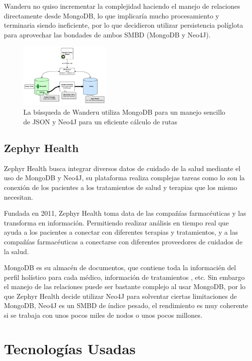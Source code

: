 \documentclass[conference]{IEEEtran}
\begin{document}
Wanderu no quiso incrementar la complejidad haciendo el manejo de relaciones directamente desde MongoDB, lo que implicar\'ia mucho procesamiento y terminaria siendo ineficiente, por lo que decidieron utilizar persistencia pol\'iglota para aprovechar las bondades de ambos SMBD (MongoDB y Neo4J).

\begin{figure}[!h]
\centering
\includegraphics[width=0.4\textwidth]{wanderu}
\caption{La b\'usqueda de Wanderu utiliza MongoDB para un manejo sencillo de JSON y Neo4J para un eficiente c\'alculo de rutas}
\label{fig10}
\end{figure}

\subsection{Zephyr Health}
Zephyr Health busca integrar diversos datos de cuidado de la salud mediante el uso de MongoDB y Neo4J, su plataforma realiza complejas tareas como lo son la conexi\'on de los pacientes a los tratamientos de salud y terapias que los mismo necesitan.\cite{zephyr}

	Fundada en 2011, Zephyr Health toma data de las compañ\'ias farmac\'euticas y las transforma en informaci\'on. Permitiendo realizar an\'alisis en tiempo real que ayuda a los pacientes a conectar con diferentes terapias y tratamientos, y a las compañ\'ias farmac\'euticas a conectarse con diferentes proveedores de cuidados de la salud.

MongoDB es su almac\'en de documentos, que contiene toda la informaci\'en del perfil hol\'istico para cada m\'edico, informaci\'on de tratamientos , etc. Sin embargo el manejo de las relaciones puede ser bastante complejo al usar MongoDB, por lo que Zephyr Health decide utilizar Neo4J para solventar ciertas limitaciones de MongoDB, Neo4J es un SMBD de \'indice pesado, el rendimiento es muy coherente si se trabaja con unos pocos miles de nodos o unos pocos millones.

\section{Tecnolog\'ias Usadas}
\end{document}

